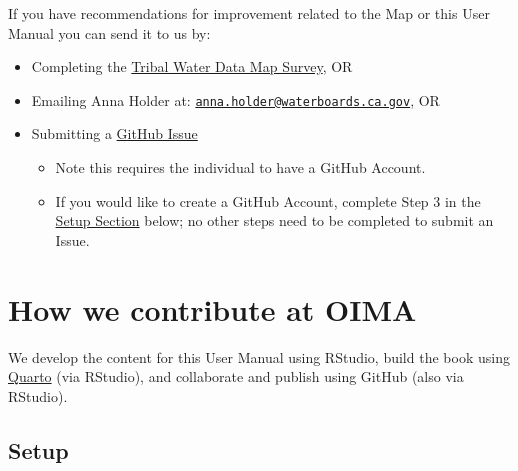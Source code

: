 \documentclass[
  letterpaper,
  DIV=11,
  numbers=noendperiod]{scrreprt}
\providecommand{\tightlist}{%
  \setlength{\itemsep}{0pt}\setlength{\parskip}{0pt}}
\begin{document}
\begin{tcolorbox}[enhanced jigsaw, breakable, title=\textcolor{quarto-callout-important-color}{\faExclamation}\hspace{0.5em}{We want your feedback!}, coltitle=black, colframe=quarto-callout-important-color-frame, opacitybacktitle=0.6, colback=white, opacityback=0, bottomrule=.15mm, colbacktitle=quarto-callout-important-color!10!white, leftrule=.75mm, bottomtitle=1mm, toptitle=1mm, toprule=.15mm, left=2mm, titlerule=0mm, arc=.35mm, rightrule=.15mm]

If you have recommendations for improvement related to the Map or this
User Manual you can send it to us by:

\begin{itemize}
\item
  Completing the \href{https://bit.ly/TWDM_Ideas}{Tribal Water Data Map
  Survey}, OR
\item
  Emailing Anna Holder at:
  \href{mailto:anna.holder@waterboards.ca.gov}{\nolinkurl{anna.holder@waterboards.ca.gov}},
  OR
\item
  Submitting a
  \href{https://github.com/CAWaterBoardDataCenter/tribal-water-data-map-manual/issues}{GitHub
  Issue}

  \begin{itemize}
  \tightlist
  \item
    Note this requires the individual to have a GitHub Account.
  \item
    If you would like to create a GitHub Account, complete Step 3 in the
    \href{https://cawaterboarddatacenter.github.io/tribal-water-data-map-manual/contribute.html\#setup}{Setup
    Section} below; no other steps need to be completed to submit an
    Issue.
  \end{itemize}
\end{itemize}

\end{tcolorbox}

\section{How we contribute at OIMA}\label{how-we-contribute-at-oima}

We develop the content for this User Manual using RStudio, build the
book using \href{https://quarto.org/}{Quarto} (via RStudio), and
collaborate and publish using GitHub (also via RStudio).

\subsection{Setup}\label{setup}
\end{document}
